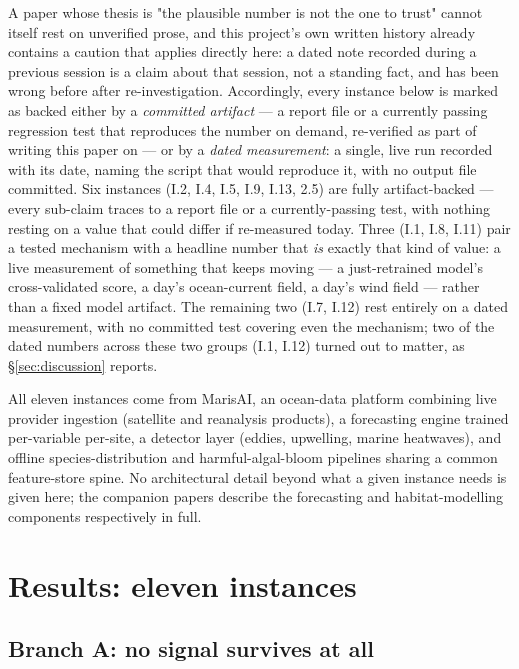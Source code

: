  A paper whose thesis is "the plausible number is not
the one to trust" cannot itself rest on unverified prose, and this project's
own written history already contains a caution that applies directly here:
a dated note recorded during a previous session is a claim about that
session, not a standing fact, and has been wrong before after
re-investigation. Accordingly, every instance below is marked as backed
either by a \emph{committed artifact} --- a report file or a currently
passing regression test that reproduces the number on demand, re-verified as
part of writing this paper on \AsOf{} --- or by a \emph{dated measurement}:
a single, live run recorded with its date, naming the script that would
reproduce it, with no output file committed. Six instances (I.2, I.4, I.5,
I.9, I.13, 2.5) are fully artifact-backed --- every sub-claim traces to a
report file or a currently-passing test, with nothing resting on a value
that could differ if re-measured today. Three (I.1, I.8, I.11) pair a
tested mechanism with a headline number that \emph{is} exactly that kind of
value: a live measurement of something that keeps moving --- a
just-retrained model's cross-validated score, a day's ocean-current field, a
day's wind field --- rather than a fixed model artifact. The remaining two
(I.7, I.12) rest entirely on a dated measurement, with no committed test
covering even the mechanism; two of the dated numbers across these two
groups (I.1, I.12) turned out to matter, as \S\ref{sec:discussion} reports.

 All eleven instances come from MarisAI, an ocean-data platform
combining live provider ingestion (satellite and reanalysis products), a
forecasting engine trained per-variable per-site, a detector layer (eddies,
upwelling, marine heatwaves), and offline species-distribution and
harmful-algal-bloom pipelines sharing a common feature-store spine. No
architectural detail beyond what a given instance needs is given here; the
companion papers \citep{risingskill2026,moredata2026} describe the
forecasting and habitat-modelling components respectively in full.

\section{Results: eleven instances}
\label{sec:results}

\subsection{Branch A: no signal survives at all}
\label{sec:branch-a}

